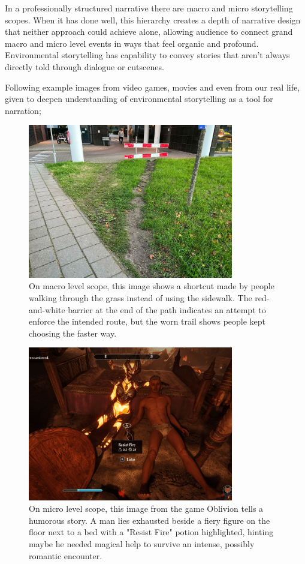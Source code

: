     In a professionally structured narrative there are macro and micro storytelling scopes. When it has done well, this hierarchy creates a depth of narrative design that neither approach could achieve alone, allowing audience to connect grand macro and micro level events in ways that feel organic and profound\cite{Environmental_Storytelling_Blogpost}. Environmental storytelling has capability to convey stories that aren’t always directly told through dialogue or cutscenes.\par

    Following example images from video games, movies and even from our real life, given to deepen understanding of environmental storytelling as a tool for narration;

    \begin{figure}[H]
    \centering
    \includegraphics[width=0.8\textwidth]{images/environmental_storytelling_02}
    \caption{On macro level scope, this image shows a shortcut made by people walking through the grass instead of using the sidewalk. The red-and-white barrier at the end of the path indicates an attempt to enforce the intended route, but the worn trail shows people kept choosing the faster way.}
    \end{figure}

    \begin{figure}[H]
    \centering
    \includegraphics[width=0.8\textwidth]{images/environmental_storytelling_04}
    \caption{On micro level scope, this image from the game Oblivion tells a humorous story. A man lies exhausted beside a fiery figure on the floor next to a bed with a "Resist Fire" potion  highlighted, hinting maybe he needed magical help to survive an intense, possibly romantic encounter.}
    \end{figure}

